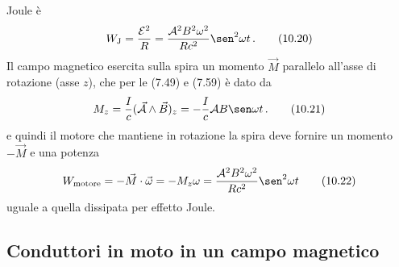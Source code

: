 \begin{enumerate}
    Joule \`e
    \begin{equation}
      W_\mathrm{J}=\frac{\mathcal E^2}{R}
      =\frac{\mathcal A^2B^2\omega^2}{Rc^2}\sen^2\omega t\,.
      \tag{10.20}
    \end{equation}
    Il campo magnetico esercita sulla spira un momento $\vec M$ parallelo
    all'asse di rotazione (asse $z$), che per le (7.49) e (7.59) \`e dato da
    \begin{equation}
      M_z=\frac{I}{c}(\vec{\mathcal A}\wedge\vec B)_z
      =-\frac{I}{c}\mathcal AB\sen\omega t\,.
      \tag{10.21}
    \end{equation}
    e quindi il motore che mantiene in rotazione la spira deve fornire un
    momento $-\vec M$ e una potenza
    \begin{equation}
      W_\mathrm{motore}=-\vec M\cdot\vec\omega
      =-M_z\omega=\frac{\mathcal A^2B^2\omega^2}{Rc^2}\sen^2\omega t
      \tag{10.22}
    \end{equation}
    uguale a quella dissipata per effetto Joule.
\end{enumerate}

\subsection{Conduttori in moto in un campo magnetico}

